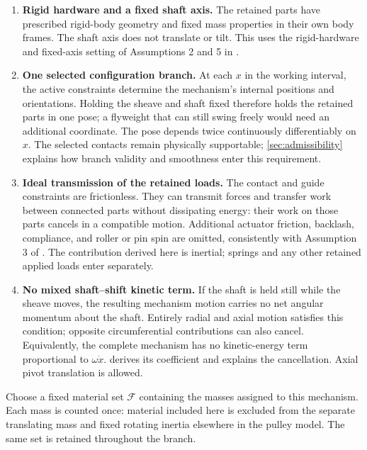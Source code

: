 \documentclass[11pt,letterpaper]{article}
\numberwithin{equation}{section}
\newcommand{\source}{\cite{formulation}}
\begin{document}
\begin{enumerate}[label=\textbf{A\arabic*.},ref=A\arabic*,leftmargin=2.8em]
\item \label{ass:rigid}\textbf{Rigid hardware and a fixed shaft axis.}
The retained parts have prescribed rigid-body geometry and fixed mass properties in their own body frames. The shaft axis does not translate or tilt. This uses the rigid-hardware and fixed-axis setting of Assumptions 2 and 5 in \source.

\item \label{ass:branch}\textbf{One selected configuration branch.}
At each $x$ in the working interval, the active constraints determine the mechanism's internal positions and orientations. Holding the sheave and shaft fixed therefore holds the retained parts in one pose; a flyweight that can still swing freely would need an additional coordinate. The pose depends twice continuously differentiably on $x$. The selected contacts remain physically supportable; \cref{sec:admissibility} explains how branch validity and smoothness enter this requirement.

\item \label{ass:ideal}\textbf{Ideal transmission of the retained loads.}
The contact and guide constraints are frictionless. They can transmit forces and transfer work between connected parts without dissipating energy: their work on those parts cancels in a compatible motion. Additional actuator friction, backlash, compliance, and roller or pin spin are omitted, consistently with Assumption 3 of \source. The contribution derived here is inertial; springs and any other retained applied loads enter separately.

\item \label{ass:mixed}\textbf{No mixed shaft--shift kinetic term.}
If the shaft is held still while the sheave moves, the resulting mechanism motion carries no net angular momentum about the shaft. Entirely radial and axial motion satisfies this condition; opposite circumferential contributions can also cancel. Equivalently, the complete mechanism has no kinetic-energy term proportional to $\omega\dot x$.  derives its coefficient and explains the cancellation. Axial pivot translation is allowed.
\end{enumerate}

Choose a fixed material set $\mathcal F$ containing the masses assigned to this mechanism. Each mass is counted once: material included here is excluded from the separate translating mass and fixed rotating inertia elsewhere in the pulley model. The same set is retained throughout the branch.
\end{document}
